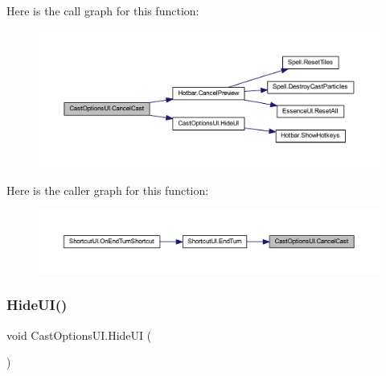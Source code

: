 Here is the call graph for this function\+:\nopagebreak
\begin{figure}[H]
\begin{center}
\leavevmode
\includegraphics[width=350pt]{class_cast_options_u_i_a78fb30f53f8da2443cb801bd878dc149_cgraph}
\end{center}
\end{figure}
Here is the caller graph for this function\+:\nopagebreak
\begin{figure}[H]
\begin{center}
\leavevmode
\includegraphics[width=350pt]{class_cast_options_u_i_a78fb30f53f8da2443cb801bd878dc149_icgraph}
\end{center}
\end{figure}
\mbox{\label{class_cast_options_u_i_affc98e48b03c51f4dddda5cb96920697}} 
\subsubsection{\texorpdfstring{HideUI()}{HideUI()}}
{\footnotesize\ttfamily void Cast\+Options\+U\+I.\+Hide\+UI (\begin{DoxyParamCaption}{ }\end{DoxyParamCaption})}

